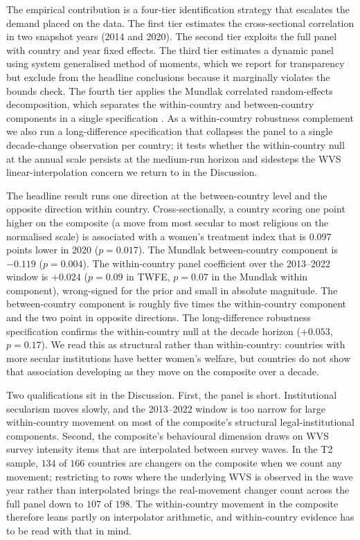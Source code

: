 \documentclass[12pt,a4paper]{article}
\begin{document}
The empirical contribution is a four-tier identification strategy that escalates the demand placed on the data. The first tier estimates the cross-sectional correlation in two snapshot years (2014 and 2020). The second tier exploits the full panel with country and year fixed effects. The third tier estimates a dynamic panel using system generalised method of moments, which we report for transparency but exclude from the headline conclusions because it marginally violates the \citet{Roodman2009} bounds check. The fourth tier applies the Mundlak correlated random-effects decomposition, which separates the within-country and between-country components in a single specification \citep{Mundlak1978, BellJones2015}. As a within-country robustness complement we also run a long-difference specification \citep{AcemogluJohnsonRobinsonYared2008, BesleyPersson2011} that collapses the panel to a single decade-change observation per country; it tests whether the within-country null at the annual scale persists at the medium-run horizon and sidesteps the WVS linear-interpolation concern we return to in the Discussion.

The headline result runs one direction at the between-country level and the opposite direction within country. Cross-sectionally, a country scoring one point higher on the composite (a move from most secular to most religious on the normalised scale) is associated with a women's treatment index that is $0.097$ points lower in 2020 ($p = 0.017$). The Mundlak between-country component is $-0.119$ ($p = 0.004$). The within-country panel coefficient over the 2013--2022 window is $+0.024$ ($p = 0.09$ in TWFE, $p = 0.07$ in the Mundlak within component), wrong-signed for the prior and small in absolute magnitude. The between-country component is roughly five times the within-country component and the two point in opposite directions. The long-difference robustness specification confirms the within-country null at the decade horizon ($+0.053$, $p = 0.17$). We read this as structural rather than within-country: countries with more secular institutions have better women's welfare, but countries do not show that association developing as they move on the composite over a decade.

Two qualifications sit in the Discussion. First, the panel is short. Institutional secularism moves slowly, and the 2013--2022 window is too narrow for large within-country movement on most of the composite's structural legal-institutional components. Second, the composite's behavioural dimension draws on WVS survey intensity items that are interpolated between survey waves. In the T2 sample, $134$ of $166$ countries are changers on the composite when we count any movement; restricting to rows where the underlying WVS is observed in the wave year rather than interpolated brings the real-movement changer count across the full panel down to $107$ of $198$. The within-country movement in the composite therefore leans partly on interpolator arithmetic, and within-country evidence has to be read with that in mind.
\end{document}
